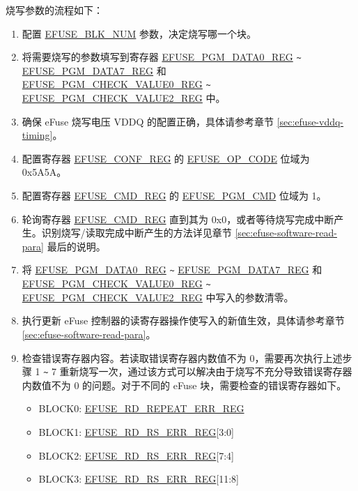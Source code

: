 \documentclass[main\_\_CN.tex]{subfiles}
\begin{document}
烧写参数的流程如下：
\begin{enumerate}
\item 配置 \hyperref[fielddesc:EFUSEBLKNUM]{EFUSE\_BLK\_NUM} 参数，决定烧写哪一个块。

\item 将需要烧写的参数填写到寄存器 \hyperref[regdesc:EFUSEPGMDATA0REG]{EFUSE\_PGM\_DATA0\_REG} \verb+~+ \hyperref[regdesc:EFUSEPGMDATA7REG]{EFUSE\_PGM\_DATA7\_REG} 和\\ \hyperref[regdesc:EFUSEPGMCHECKVALUE0REG]{EFUSE\_PGM\_CHECK\_VALUE0\_REG}  \verb+~+  \hyperref[regdesc:EFUSEPGMCHECKVALUE2REG]{EFUSE\_PGM\_CHECK\_VALUE2\_REG} 中。


\item 确保 eFuse 烧写电压 VDDQ 的配置正确，具体请参考章节 \ref{sec:efuse-vddq-timing}。

\item 配置寄存器 \hyperref[regdesc:EFUSECONFREG]{EFUSE\_CONF\_REG} 的 \hyperref[fielddesc:EFUSEOPCODE]{EFUSE\_OP\_CODE} 位域为 0x5A5A。

\item 配置寄存器 \hyperref[regdesc:EFUSECMDREG]{EFUSE\_CMD\_REG} 的 \hyperref[fielddesc:EFUSEPGMCMD]{EFUSE\_PGM\_CMD} 位域为 1。

\item 轮询寄存器 \hyperref[regdesc:EFUSECMDREG]{EFUSE\_CMD\_REG} 直到其为 0x0，或者等待烧写完成中断产生。识别烧写/读取完成中断产生的方法详见章节 \ref{sec:efuse-software-read-para} 最后的说明。

\item 将 \hyperref[regdesc:EFUSEPGMDATA0REG]{EFUSE\_PGM\_DATA0\_REG} \verb+~+ \hyperref[regdesc:EFUSEPGMDATA7REG]{EFUSE\_PGM\_DATA7\_REG} 和\\ \hyperref[regdesc:EFUSEPGMCHECKVALUE0REG]{EFUSE\_PGM\_CHECK\_VALUE0\_REG}  \verb+~+  \hyperref[regdesc:EFUSEPGMCHECKVALUE2REG]{EFUSE\_PGM\_CHECK\_VALUE2\_REG} 中写入的参数清零。

\item 执行更新 eFuse 控制器的读寄存器操作使写入的新值生效，具体请参考章节 \ref{sec:efuse-software-read-para}。
\item 检查错误寄存器内容。若读取错误寄存器内数值不为 0，需要再次执行上述步骤 1 \verb+~+ 7 重新烧写一次，通过该方式可以解决由于烧写不充分导致错误寄存器内数值不为 0 的问题。对于不同的 eFuse 块，需要检查的错误寄存器如下。
\begin{itemize}
    \item BLOCK0: \hyperref[regdesc:EFUSERDREPEATERRREG]{EFUSE\_RD\_REPEAT\_ERR\_REG}
    \item BLOCK1: \hyperref[regdesc:EFUSERDRSERRREG]{EFUSE\_RD\_RS\_ERR\_REG}[3:0]
    \item BLOCK2: \hyperref[regdesc:EFUSERDRSERRREG]{EFUSE\_RD\_RS\_ERR\_REG}[7:4]
    \item BLOCK3: \hyperref[regdesc:EFUSERDRSERRREG]{EFUSE\_RD\_RS\_ERR\_REG}[11:8]
\end{itemize}
\end{enumerate}
\end{document}
